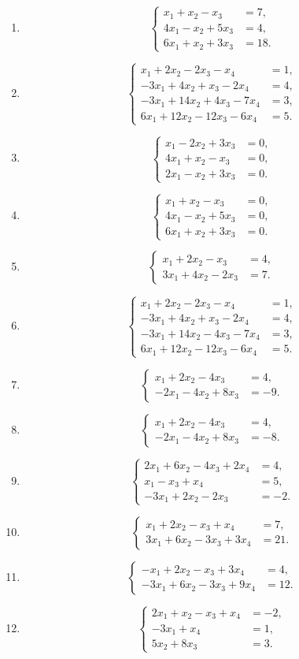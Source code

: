 \documentclass[12pt]{article}
\theoremstyle{remark}
\newcommand{\sistema}[1]{%
\[
\left\{
\begin{aligned}
#1
\end{aligned}
\right.
\]
}
\begin{document}
\begin{enumerate}[label=\textbf{\arabic*.},leftmargin=*]
\item \sistema{
x_1+x_2-x_3&=7,\\
4x_1-x_2+5x_3&=4,\\
6x_1+x_2+3x_3&=18.
}

\item \sistema{
x_1+2x_2-2x_3-x_4&=1,\\
-3x_1+4x_2+x_3-2x_4&=4,\\
-3x_1+14x_2+4x_3-7x_4&=3,\\
6x_1+12x_2-12x_3-6x_4&=5.
}

\item \sistema{
x_1-2x_2+3x_3&=0,\\
4x_1+x_2-x_3&=0,\\
2x_1-x_2+3x_3&=0.
}

\item \sistema{
x_1+x_2-x_3&=0,\\
4x_1-x_2+5x_3&=0,\\
6x_1+x_2+3x_3&=0.
}

\item \sistema{
x_1+2x_2-x_3&=4,\\
3x_1+4x_2-2x_3&=7.
}

\item \sistema{
x_1+2x_2-2x_3-x_4&=1,\\
-3x_1+4x_2+x_3-2x_4&=4,\\
-3x_1+14x_2-4x_3-7x_4&=3,\\
6x_1+12x_2-12x_3-6x_4&=5.
}

\item \sistema{
x_1+2x_2-4x_3&=4,\\
-2x_1-4x_2+8x_3&=-9.
}

\item \sistema{
x_1+2x_2-4x_3&=4,\\
-2x_1-4x_2+8x_3&=-8.
}

\item \sistema{
2x_1+6x_2-4x_3+2x_4&=4,\\
x_1-x_3+x_4&=5,\\
-3x_1+2x_2-2x_3&=-2.
}

\item \sistema{
x_1+2x_2-x_3+x_4&=7,\\
3x_1+6x_2-3x_3+3x_4&=21.
}

\item \sistema{
-x_1+2x_2-x_3+3x_4&=4,\\
-3x_1+6x_2-3x_3+9x_4&=12.
}

\item \sistema{
2x_1+x_2-x_3+x_4&=-2,\\
-3x_1+x_4&=1,\\
5x_2+8x_3&=3.
}


\end{enumerate}
\end{document}
